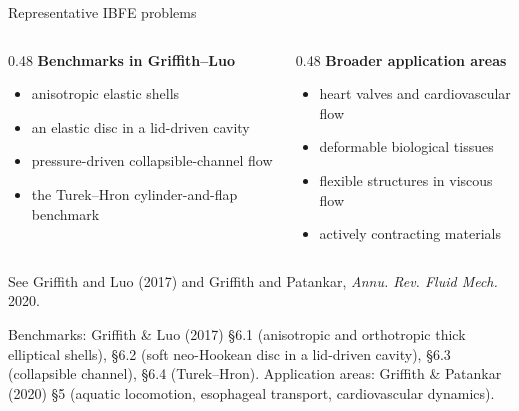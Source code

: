 \documentclass[aspectratio=169,11pt]{beamer}
\begin{document}
\begin{frame}{Representative IBFE problems}
\begin{columns}[T,onlytextwidth]
\begin{column}{0.48\textwidth}
\textbf{Benchmarks in Griffith--Luo}
\begin{itemize}\itemsep6pt
  \item anisotropic elastic shells
  \item an elastic disc in a lid-driven cavity
  \item pressure-driven collapsible-channel flow
  \item the Turek--Hron cylinder-and-flap benchmark
\end{itemize}
\end{column}
\begin{column}{0.48\textwidth}
\textbf{Broader application areas}
\begin{itemize}\itemsep6pt
  \item heart valves and cardiovascular flow
  \item deformable biological tissues
  \item flexible structures in viscous flow
  \item actively contracting materials
\end{itemize}
\end{column}
\end{columns}

\vfill
{\scriptsize See Griffith and Luo (2017) and Griffith and Patankar, \emph{Annu. Rev. Fluid Mech.} 2020.\par
\color{DarkGray}Benchmarks: Griffith \& Luo (2017) \S6.1 (anisotropic and orthotropic thick elliptical shells), \S6.2 (soft neo-Hookean disc in a lid-driven cavity), \S6.3 (collapsible channel), \S6.4 (Turek--Hron). Application areas: Griffith \& Patankar (2020) \S5 (aquatic locomotion, esophageal transport, cardiovascular dynamics).\par}
\end{frame}
\end{document}

